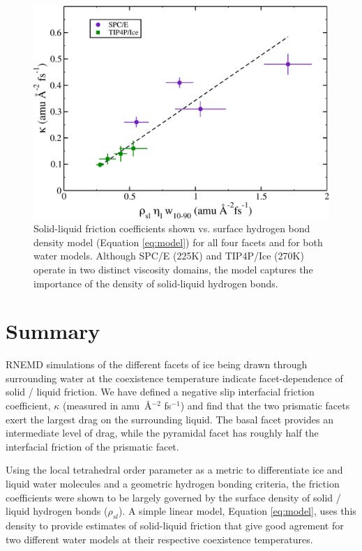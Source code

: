 \begin{figure}
\includegraphics[width=\linewidth]{Figures/simpleModel}
\caption{\label{fig:simpleModel} Solid-liquid friction coefficients
  shown vs. surface hydrogen bond density model (Equation \eqref{eq:model})
  for all four facets and for both water models.  Although SPC/E
  (225K) and TIP4P/Ice (270K) operate in two distinct viscosity
  domains, the model captures the importance of the density of
  solid-liquid hydrogen bonds.}
\end{figure}                                            

\section{Summary}
RNEMD simulations of the different facets of ice being drawn through
surrounding water at the coexistence temperature indicate
facet-dependence of solid / liquid friction.  We have defined a
negative slip interfacial friction coefficient, $\kappa$ (measured in
amu~\AA$^{-2}$ fs$^{-1}$) and find that the two prismatic facets exert
the largest drag on the surrounding liquid.  The basal facet provides
an intermediate level of drag, while the pyramidal facet has roughly
half the interfacial friction of the prismatic facet.

Using the local tetrahedral order parameter as a metric to
differentiate ice and liquid water molecules and a geometric hydrogen
bonding criteria, the friction coefficients were shown to be largely
governed by the surface density of solid / liquid hydrogen bonds
($\rho_{sl}$).  A simple linear model, Equation \eqref{eq:model}, uses
this density to provide estimates of solid-liquid friction that give
good agrement for two different water models at their respective
coexistence temperatures.

